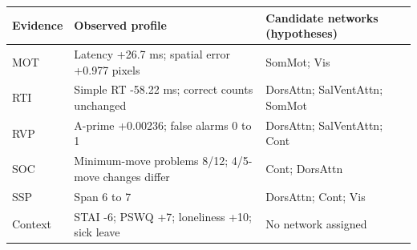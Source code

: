 \begin{tabular}{lp{.45\linewidth}p{.30\linewidth}}
\toprule
Evidence & Observed profile & Candidate networks (hypotheses) \\
\midrule
MOT & Latency +26.7 ms; spatial error +0.977 pixels & SomMot; Vis \\
RTI & Simple RT -58.22 ms; correct counts unchanged & DorsAttn; SalVentAttn; SomMot \\
RVP & A-prime +0.00236; false alarms 0 to 1 & DorsAttn; SalVentAttn; Cont \\
SOC & Minimum-move problems 8/12; 4/5-move changes differ & Cont; DorsAttn \\
SSP & Span 6 to 7 & DorsAttn; Cont; Vis \\
Context & STAI -6; PSWQ +7; loneliness +10; sick leave & No network assigned \\
\bottomrule
\end{tabular}
